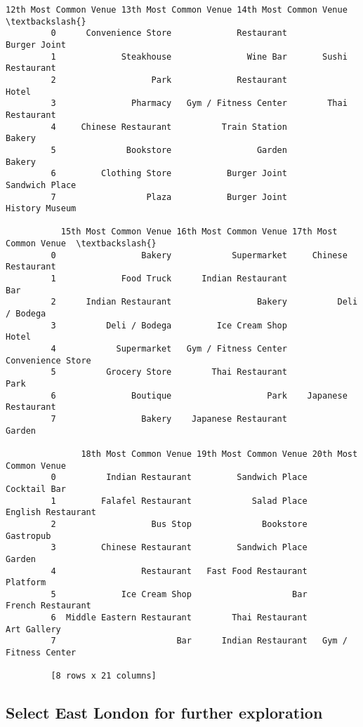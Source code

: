 \documentclass[11pt]{article}
\begin{document}
\begin{Verbatim}[commandchars=\\\{\}]
           12th Most Common Venue 13th Most Common Venue 14th Most Common Venue  \textbackslash{}
         0      Convenience Store             Restaurant           Burger Joint   
         1             Steakhouse               Wine Bar       Sushi Restaurant   
         2                   Park             Restaurant                  Hotel   
         3               Pharmacy   Gym / Fitness Center        Thai Restaurant   
         4     Chinese Restaurant          Train Station                 Bakery   
         5              Bookstore                 Garden                 Bakery   
         6         Clothing Store           Burger Joint         Sandwich Place   
         7                  Plaza           Burger Joint         History Museum   
         
           15th Most Common Venue 16th Most Common Venue 17th Most Common Venue  \textbackslash{}
         0                 Bakery            Supermarket     Chinese Restaurant   
         1             Food Truck      Indian Restaurant                    Bar   
         2      Indian Restaurant                 Bakery          Deli / Bodega   
         3          Deli / Bodega         Ice Cream Shop                  Hotel   
         4            Supermarket   Gym / Fitness Center      Convenience Store   
         5          Grocery Store        Thai Restaurant                   Park   
         6               Boutique                   Park    Japanese Restaurant   
         7                 Bakery    Japanese Restaurant                 Garden   
         
               18th Most Common Venue 19th Most Common Venue 20th Most Common Venue  
         0          Indian Restaurant         Sandwich Place           Cocktail Bar  
         1         Falafel Restaurant            Salad Place     English Restaurant  
         2                   Bus Stop              Bookstore              Gastropub  
         3         Chinese Restaurant         Sandwich Place                 Garden  
         4                 Restaurant   Fast Food Restaurant               Platform  
         5             Ice Cream Shop                    Bar      French Restaurant  
         6  Middle Eastern Restaurant        Thai Restaurant            Art Gallery  
         7                        Bar      Indian Restaurant   Gym / Fitness Center  
         
         [8 rows x 21 columns]
\end{Verbatim}
            
    \subsection{Select East London for further
exploration}\label{select-east-london-for-further-exploration}
\end{document}
